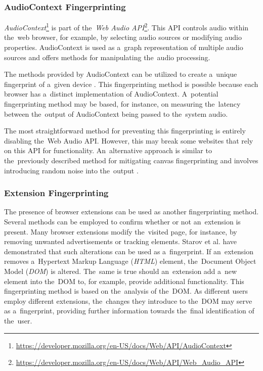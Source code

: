 \subsubsection{AudioContext Fingerprinting}

\emph{AudioContext}\footnote{\url{https://developer.mozilla.org/en-US/docs/Web/API/AudioContext}} is part of the~\emph{Web Audio API}\footnote{\url{https://developer.mozilla.org/en-US/docs/Web/API/Web_Audio_API}}. This API controls audio within the~web browser, for example, by selecting audio sources or modifying audio properties. AudioContext is used as a~graph representation of multiple audio sources and offers methods for manipulating the~audio processing.

The methods provided by AudioContext can be utilized to create a~unique fingerprint of a~given device \cite{audio-muni}. This fingerprinting method is possible because each browser has a~distinct implementation of AudioContext. A~potential fingerprinting method may be based, for instance, on measuring the~latency between the~output of AudioContext being passed to the~system audio.

The most straightforward method for preventing this fingerprinting is entirely disabling the~Web Audio API. However, this may break some websites that rely on this API for functionality. An~alternative approach is similar to the~previously described method for mitigating canvas fingerprinting and involves introducing random noise into the~output \cite{audio-fingerprint-protection}.


\subsubsection{Extension Fingerprinting}
The presence of browser extensions can be used as another fingerprinting method. Several methods can be employed to confirm whether or not an~extension is present. Many browser extensions modify the~visited page, for instance, by removing unwanted advertisements or tracking elements. Starov et al. \cite{dom-fingerprinting} have demonstrated that such alterations can be used as a~fingerprint. If an~extension removes a~Hypertext Markup Language (\textit{HTML}) element, the~Document Object Model (\textit{DOM}) is altered. The~same is true should an~extension add a~new element into the~DOM to, for example, provide additional functionality. This fingerprinting method is based on the~analysis of the~DOM. As different users employ different extensions, the~changes they introduce to the~DOM may serve as a~fingerprint, providing further information towards the~final identification of the~user.

